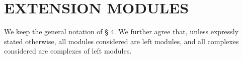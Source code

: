 \section{EXTENSION MODULES}

We keep the general notation of § 4. We further agree that, unless expressly stated otherwise, all modules considered are left modules, and all complexes considered are complexes of left modules.

